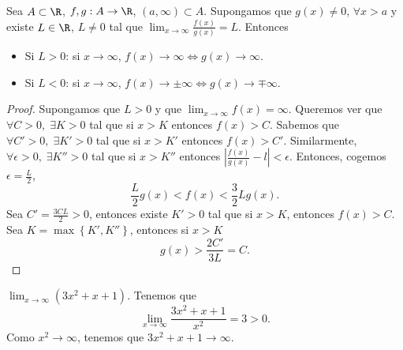 \begin{ftheorem}[]
\normalfont Sea $\displaystyle A\subset\R $, $\displaystyle f, g : A \to \R $, $\displaystyle \left(a, \infty\right)\subset A $. Supongamos que $\displaystyle g\left(x\right) \neq 0 $, $\displaystyle \forall x > a $ y existe $\displaystyle L \in \R $, $\displaystyle L\neq 0 $ tal que $\displaystyle \lim_{x \to \infty}\frac{f\left(x\right)}{g\left(x\right)} = L$. Entonces
\begin{itemize}
\item Si $\displaystyle L > 0 $: si $\displaystyle x \to \infty $, $\displaystyle f\left(x\right) \to \infty \iff g\left(x\right) \to \infty $.
\item Si $\displaystyle L < 0 $: si $\displaystyle x \to \infty $, $\displaystyle f\left(x\right) \to \pm \infty \iff g\left(x\right) \to \mp \infty $.
\end{itemize}
\end{ftheorem}

\begin{proof}
Supongamos que $\displaystyle L > 0 $ y que $\displaystyle \lim_{x \to \infty}f\left(x\right) = \infty $. Queremos ver que $\displaystyle \forall C > 0, \; \exists K > 0 $ tal que si $\displaystyle x > K $ entonces $\displaystyle f\left(x\right) > C $. Sabemos que $\displaystyle \forall C' > 0, \; \exists K' > 0 $ tal que si $\displaystyle x > K' $ entonces $\displaystyle f\left(x\right) > C' $. Similarmente, $\displaystyle \forall \epsilon > 0, \; \exists K'' > 0 $ tal que si $\displaystyle x > K'' $ entonces $\displaystyle \left|\frac{f\left(x\right)}{g\left(x\right)}-l\right|<\epsilon  $. Entonces, cogemos $\displaystyle \epsilon = \frac{L}{2} $,
\[ \frac{L}{2}g\left(x\right)< f\left(x\right) < \frac{3}{2}Lg\left(x\right)  .\]
Sea $\displaystyle C' = \frac{3CL}{2} > 0 $, entonces existe $\displaystyle K'>0 $ tal que si $\displaystyle x > K $, entonces $\displaystyle f\left(x\right) > C $. Sea $\displaystyle K = \max \left\{ K', K''\right\}  $, entonces si $\displaystyle x > K $ 
\[ g\left(x\right) > \frac{2C'}{3L} = C.\]
\end{proof}

\begin{eg}
\normalfont $\displaystyle \lim_{x \to \infty}\left(3x^{2}+x+1\right) $. Tenemos que 
\[\lim_{x \to \infty}\frac{3x^{2}+x+1}{x^{2}} = 3 > 0 .\]
Como $\displaystyle x^{2} \to \infty $, tenemos que $\displaystyle 3x^{2}+x+1 \to \infty$. 
\end{eg}

